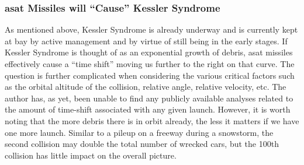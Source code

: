 \subsubsection{\ac{asat} Missiles will ``Cause'' Kessler Syndrome}
As mentioned above, Kessler Syndrome is already underway and is
currently kept at bay by active management and by virtue of still
being in the early stages.  If Kessler Syndrome is thought of as an
exponential growth of debris, \ac{asat} missiles effectively cause a
``time shift'' moving us further to the right on that curve.  The
question is further complicated when considering the various critical
factors such as the orbital altitude of the collision, relative angle,
relative velocity, etc.  The author has, as yet, been unable to find
any publicly available analyses related to the amount of time-shift
associated with any given launch.  However, it is worth noting that
the more debris there is in orbit already, the less it matters if we
have one more launch.  Similar to a pileup on a freeway during a
snowstorm, the second collision may double the total number of wrecked
cars, but the 100th collision has little impact on the overall
picture.
